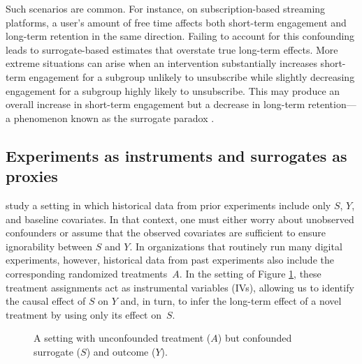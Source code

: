 \documentclass[11pt]{article}
\theoremstyle{plain}
\theoremstyle{definition}
\theoremstyle{remark}
\theoremstyle{definition}
\begin{document}
Such scenarios are common. For instance, on subscription-based streaming platforms, a user's amount of free time affects both short-term engagement and long-term retention in the same direction. Failing to account for this confounding leads to surrogate-based estimates that overstate true long-term effects. More extreme situations can arise when an intervention substantially increases short-term engagement for a subgroup unlikely to unsubscribe while slightly decreasing engagement for a subgroup highly likely to unsubscribe. This may produce an overall increase in short-term engagement but a decrease in long-term retention---a phenomenon known as the surrogate paradox \citep{elliott2015surrogacy}.

\subsection{Experiments as instruments and surrogates as proxies}

\citet{athey2019surrogate} study a setting in which historical data from prior experiments include only $S$, $Y$, and baseline covariates. In that context, one must either worry about unobserved confounders or assume that the observed covariates are sufficient to ensure ignorability between $S$ and $Y$. In organizations that routinely run many digital experiments, however, historical data from past experiments also include the corresponding randomized treatments~$A$. In the setting of Figure \ref{fig:simple}, these treatment assignments act as instrumental variables (IVs), allowing us to identify the causal effect of $S$ on $Y$ and, in turn, to infer the long-term effect of a novel treatment by using only its effect on~$S$.
 

 


\begin{figure}[b]
\centering
\caption{Causal diagrams for surrogate settings with unobserved confounders. Dashed circles ($U$) indicate unobserved variables. Dotted circles ($Y$) indicate variables observed historically, but unobserved for novel treatments.}
\centering
{}\vspace{1em}
\caption{A setting with unconfounded treatment ($A$) but confounded surrogate ($S$) and outcome ($Y$).}\label{fig:simple}

\end{figure}
\end{document}
